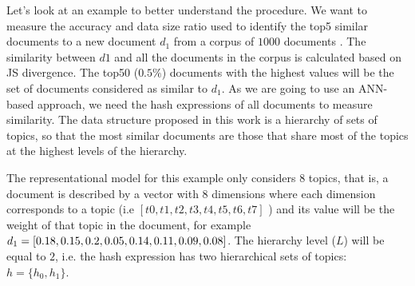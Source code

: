 Let's look at an example to better understand the procedure. We want to measure the accuracy and data size ratio used to identify the top5 similar documents to a new document $d_1$ from a corpus of $1000$ documents . The similarity between $d1$ and all the documents in the corpus is calculated based on JS divergence. The top50 ($0.5\%$) documents with the highest values will be the set of documents considered as similar to $d_1$. As we are going to use an ANN-based approach, we need the hash expressions of all documents to measure similarity. The data structure proposed in this work is a hierarchy of sets of topics, so that the most similar documents are those that share most of the topics at the highest levels of the hierarchy.

The representational model for this example only considers 8 topics, that is, a document is described by a vector with $8$ dimensions where each dimension corresponds to a topic (i.e $[t0, t1, t2, t3, t4, t5, t6, t7]$ ) and its value will be the weight of that topic in the document, for example $d_1=[0.18, 0.15, 0.2, 0.05, 0.14, 0.11, 0.09,\\ 0.08]$. The hierarchy level ($L$) will be equal to $2$, i.e. the hash expression has two hierarchical sets of topics: $h=\{h_0, h_1\}$. 

